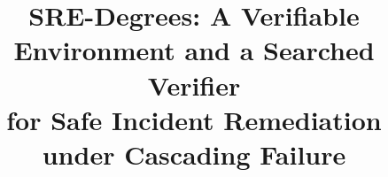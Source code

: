\documentclass[letterpaper]{article} %
\title{SRE-Degrees: A Verifiable Environment and a Searched Verifier\\
       for Safe Incident Remediation under Cascading Failure}
\author{}                      %
\begin{document}
\maketitle

\begin{abstract}

\end{abstract}





\end{document}
